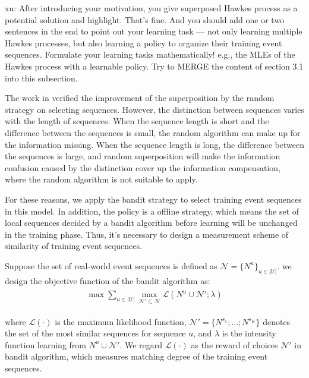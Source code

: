 \documentclass[runningheads]{llncs}
\newcommand{\xu}[1]{{\color{red} xu: #1}}
\begin{document}
\xu{After introducing your motivation, you give superposed Hawkes process as a potential solution and highlight. That's fine. And you should add one or two sentences in the end to point out your learning task --- not only learning multiple Hawkes processes, but also learning a policy to organize their training event sequences. Formulate your learning tasks mathematically! e.g., the MLEs of the Hawkes process with a learnable policy. Try to MERGE the content of section 3.1 into this subsection.}

The work in \cite{xu2018benefits} verified the improvement of the superposition by the random strategy on selecting sequences. 
However, the distinction between sequences varies with the length of sequences. When the sequence length is short and the difference between the sequences is small, the random algorithm can make up for the information missing. When the sequence length is long, the difference between the sequences is large, and random superposition will make the information confusion caused by the distinction cover up the information compensation, where the random algorithm is not suitable to apply. 

For these reasons, we apply the bandit strategy to select training event sequences in this model. In addition, the policy is a offline strategy, which means the set of local sequences decided by a bandit algorithm before learning will be unchanged in the training phase. Thus, it's necessary to design a measurement scheme of similarity of training event sequences.

Suppose the set of real-world event sequences is defined as $\mathcal{N} = \{N^u\}_{u \in |\mathcal{U}|}$. we design the objective function of the bandit algorithm as:
\begin{eqnarray}
\begin{aligned}
\max \sum_{u \in |\mathcal{U}|} \max_{\mathcal{N}' \subset \mathcal{N}} \mathcal{L}(N^u \cup \mathcal{N}'; \lambda)
\end{aligned}    
\end{eqnarray}

where $\mathcal{L}(\cdot)$ is the maximum likelihood function, $\mathcal{N}'=\{N^{s_1};\ldots;N^{s_K}\}$ denotes the set of the most similar sequences for sequence $u$, and $\lambda$ is the intensity function learning from $N^u \cup \mathcal{N}'$. We regard $\mathcal{L}(\cdot)$ as the reward of choices $\mathcal{N}'$ in bandit algorithm, which measures matching degree of the training event sequences.
\end{document}
